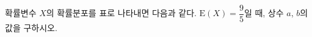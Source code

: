 확률변수 $X$의 확률분포를 표로 나타내면 다음과 같다. $\mathrm{E}(X)=\dfrac{9}{5}$일 때, 상수 $a$, $b$의 값을 구하시오.
\par\smallskip\begin{center}\resizebox{\ifdim\width>\linewidth\linewidth\else\width\fi}{!}{}\end{center}

